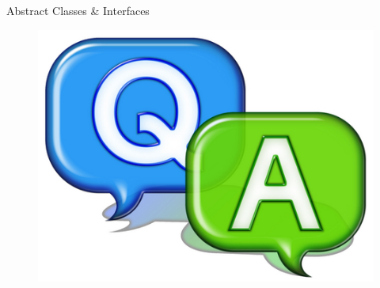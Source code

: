 \documentclass[14pt]{beamer}
\begin{document}
\begin{frame}{Abstract Classes \& Interfaces}
 \begin{figure}[H]
 \begin{center}
   \includegraphics[scale=.3]{qa.png}   
 \end{center}
  \end{figure}
\end{frame}
\end{document}
